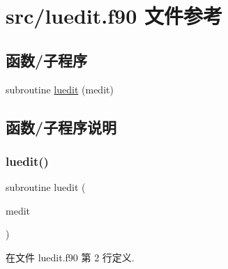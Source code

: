 \hypertarget{luedit_8f90}{}\section{src/luedit.f90 文件参考}
\label{luedit_8f90}
\subsection*{函数/子程序}
\begin{DoxyCompactItemize}
\item 
subroutine \mbox{\hyperlink{luedit_8f90_aedec58b9b55eeb115502143342210e29}{luedit}} (medit)
\end{DoxyCompactItemize}


\subsection{函数/子程序说明}
\mbox{\label{luedit_8f90_aedec58b9b55eeb115502143342210e29}} 
\subsubsection{\texorpdfstring{luedit()}{luedit()}}
{\footnotesize\ttfamily subroutine luedit (\begin{DoxyParamCaption}\item[{}]{medit }\end{DoxyParamCaption})}



在文件 luedit.\+f90 第 2 行定义.

